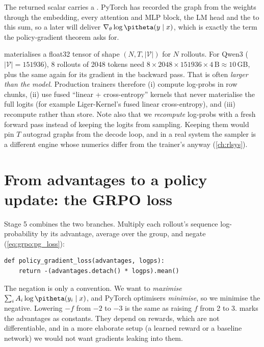 The returned scalar carries a . PyTorch has recorded the graph from the
weights through the embedding, every attention and MLP block, the LM head and the
 to this sum, so a later  will deliver
$\nabla_\theta\log\pitheta(y\mid x)$, which is exactly the term the policy-gradient theorem asks for.

\begin{systemslens}
 materialises a float32 tensor of shape
$(N, T, |\mathcal V|)$ for $N$ rollouts. For Qwen3 ($|\mathcal V|=\num{151936}$), 8 rollouts
of 2048 tokens need $8\times2048\times\num{151936}\times4\,\text{B}\approx10$\,GB, plus the
same again for its gradient in the backward pass. That is often \emph{larger than the
model}. Production trainers therefore (i) compute log-probs in row chunks, (ii) use fused
``linear + cross-entropy'' kernels that never materialise the full logits (for example
Liger-Kernel's fused linear cross-entropy), and (iii) recompute rather than store. Note
also that we \emph{recompute} log-probs with a fresh forward pass instead of keeping the
logits from sampling. Keeping them would pin $T$ autograd graphs from the decode loop,
and in a real system the sampler is a different engine whose numerics differ from the
trainer's anyway (\cref{ch:rlsys}).
\end{systemslens}

\section{From advantages to a policy update: the GRPO loss}\label{sec:grpo:loss}

Stage 5 combines the two branches. Multiply each rollout's sequence log-probability by its
advantage, average over the group, and negate (\cref{eq:grpo:pg_loss}):

\begin{lstlisting}[caption={The policy-gradient loss.},label={lst:grpo:pgloss}]
def policy_gradient_loss(advantages, logps):
    return -(advantages.detach() * logps).mean()
\end{lstlisting}

The negation is only a convention. We want to \emph{maximise}
$\sum_iA_i\log\pitheta(y_i\mid x)$, and PyTorch optimisers \emph{minimise}, so we minimise the
negative. Lowering $-f$ from $-2$ to $-3$ is the same as raising $f$ from 2 to 3.
 marks the advantages as constants. They depend on rewards, which are not
differentiable, and in a more elaborate setup (a learned reward or a baseline network) we
would not want gradients leaking into them.

